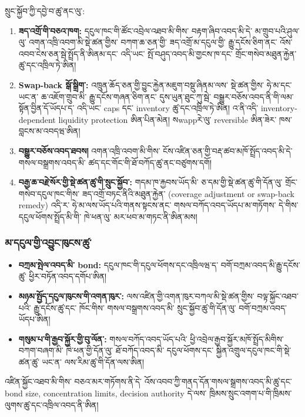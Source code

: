\documentclass[11pt]{article}
\begin{document}
སྲུང་སྐྱོབ་ཀྱི་དབྱེ་བ་ཚུ་ནང་ལུ་:

\begin{enumerate}[leftmargin=*]
\item \textbf{ཟད་འགྲོ་གི་བཅའ་ཁག:} དངུལ་ཁང་གི་ཚོང་འབྲེལ་འཐབ་མི་གིས་ བརྟག་ཞིབ་འབད་མི་དེ་ མ་གྲུབ་པའི་ཤུལ་ལུ་ འགན་འཁྲི་འབག་མི་སྡེ་ཚན་གྱིས་ བཀག་ཆ་ཅན་གྱི་ ཟད་འགྲོ་མ་དངུལ་གྱི་ རྒྱུ་དངོས་ཅིག་ནང་ འོས་འབབ་ངེས་ཅན་སྦེ་སྤྲོད་ནི་ཨིནམ་དང་ འདི་ཡང་ སྤོ་བཤུད་འབད་མི་གྱངས་ཁ་དང་ གྲོང་གསེབ་མཐུན་རྐྱེན་ཚུ་དང་འཁྲིལ་ཏེ་ཨིན།
\item \textbf{Swap-back སྒོ་སྒྲིག་:} འཁྲུན་ཆོད་ཅན་གྱི་བྱུང་རྐྱེན་མཇུག་བསྡུ་ཞིནམ་ལས་ སྡེ་ཚན་གྱིས་ ཧེ་མ་དང་ ཡང་ན་ ཆ་འཇོག་གྲུབ་མི་ རྒྱུ་དངོས་གཞན་ཅིག་ནང་ དུས་ཡུན་ཐུང་ཀུ་སྦེ་ བསྒྱུར་བཅོས་འབད་ནི་གི་ལམ་སྟོན་བྱིན་དོ་ཡོདཔ་ད་ འདི་ཡང་ caps དང་ inventory ཚུ་དང་འཁྲིལ་ཏེ་ཨིན། འ་ནི་འདི་ inventory-dependent liquidity protection ཨིན་པིན་མེན། སwappརེ་ལུ་ reversible ཨིན་ཟེར་ ཁས་བླངས་མ་འབདཝ་ཨིན།
\item \textbf{བསྒྱུར་བཅོས་འབད་ཐབས།} འགན་འཁྲི་འབག་མི་གིས་ ངོས་འཛིན་ཅན་གྱི་བརྡ་ཚབ་མཁོ་སྤྲོད་འབད་མི་དེ་ གསལ་བསྒྲགས་འབད་མི་ ཚད་དང་གོང་གི་ཐོ་བཀོད་ཚུ་ནང་བཙུགས་དགོ།
\item \textbf{བརྒྱ་ཆ་བརྗེ་སོར་གྱི་སྡེ་ཚན་ཚུ་གི་སྲུང་སྐྱོབ་:} གདམ་ཁ་རྐྱབས་ཡོད་མི་ ཅ་དམ་གྱི་སྡེ་ཚན་ཚུ་གི་དོན་ལུ་ གྲོང་གསེབ་དངུལ་ཁང་གིས་ ཟད་འགྲོ་བཏང་ནིའི་མཐུན་རྐྱེན་ (coverage adjustment or swap-back remedy) འདི་ར་ ཧེ་མ་ལས་ཡོད་པའི་གནས་སྟངས་ནང་ གསལ་བཀོད་འབད་ཡོདཔ་མ་གཏོགས་ དེ་གིས་ དངུལ་ཕོགས་སྤྲོད་མི་གི་ ཁེ་ཕན་ལུ་ མར་ཕབ་མ་གཏང་ནི་ཨིན་མས།
\end{enumerate}
\subsubsection*{མ་དངུལ་གྱི་འབྱུང་ཁུངས་ཚུ་}

\begin{itemize}[leftmargin=*]
\item \textbf{བཀྲམ་སྤེལ་འབད་མི་ bond:} དངུལ་ཁང་གི་དངུལ་ཕོགས་དང་འཁྲིལཝ་ད་ བགོ་བཀྲམ་འབད་མི་རྒྱུ་དངོས་ཚུ་ ཕྱིར་བཏོན་འབད་དགོཔ་ཨིན།
\item \textbf{མཉམ་སྤྱོད་དངུལ་ཁུངས་གི་འགན་ཁུར་:} ལས་འཛིན་གྱི་འགན་ཁུར་བཀལ་མི་སྡེ་ཚན་གྱིས་ བལྟ་སྐྱོང་འཐབ་པའི་ རྒྱུ་དངོས་ཚུ་དང་ ཁོང་གིས་ གསལ་བསྒྲགས་འབད་མི་ སྲུང་སྐྱོབ་ཚུ་གི་དོན་ལུ་ བགོ་བཀྲམ་འབད་ཡོདཔ་ཨིན།
\item \textbf{གསུམ་པ་གི་རྒྱབ་སྐྱོར་གྱི་བུ་ལོན་:} གསལ་བཀོད་འབད་ཡོད་པའི་ ཕྱི་འབྲེལ་རྒྱབ་སྐྱོར་མཁོ་སྤྲོད་མིགིས་ བཀག་བཞག་མི་ ཁེ་ཕན་གྱི་དོན་ལུ་ ཐོ་བཀོད་འབད་མི་ དངུལ་ཕོགས་དང་ སྐྱིན་འགྲུལ་དངུལ་ཁང་གི་སྡེ་ཚན་ཚུ་ ཡང་ན་ ལས་རིམ་ཚུ་གི་དོན་ལས་ཨིན།
\end{itemize}
འཛིན་སྐྱོང་འཐབ་མི་གིས་ བཅའ་མར་གཏོགས་ནི་དེ་ འོས་འབབ་ཀྱི་གནད་དོན་གསལ་སྒྲགས་འབད་མི་ཚུ་དང་ bond size, concentration limits, decision authority དེ་ལས་ ཁྲིམས་སྲུང་འགག་པ་གི་ཁྲིམས་ལུགས་ཚུ་དང་འཁྲིལ་འབད་ནི་ཨིན།
\end{document}
